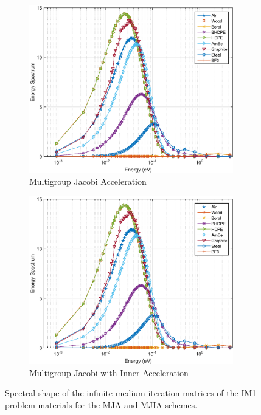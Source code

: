 \begin{figure}
\centering
	\begin{subfigure}[b]{0.775\textwidth}
		\centering
		\includegraphics[width=0.975\textwidth]{figures/sec_DSA/IM1_EC_Rich.eps}
		\caption{Multigroup Jacobi Acceleration}
	\end{subfigure}
	
	\begin{subfigure}[b]{0.775\textwidth}
		\centering
		\includegraphics[width=0.975\textwidth]{figures/sec_DSA/IM1_EC_Rich.eps}
		\caption{Multigroup Jacobi with Inner Acceleration}
	\end{subfigure}
\caption{Spectral shape of the infinite medium iteration matrices of the IM1 problem materials for the MJA and MJIA schemes.}
\label{fig::IM1_mats_EC_MJAandMJIA}
\end{figure}


